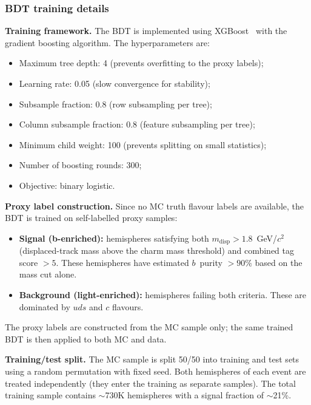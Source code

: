 \documentclass[11pt,a4paper]{article}
\begin{document}
\subsubsection{BDT training details}
\label{sec:bdt-detail}

\textbf{Training framework.}
The BDT is implemented using XGBoost~\cite{xgboost} with the gradient
boosting algorithm.  The hyperparameters are:
\begin{itemize}
\item Maximum tree depth: 4 (prevents overfitting to the proxy labels);
\item Learning rate: 0.05 (slow convergence for stability);
\item Subsample fraction: 0.8 (row subsampling per tree);
\item Column subsample fraction: 0.8 (feature subsampling per tree);
\item Minimum child weight: 100 (prevents splitting on small statistics);
\item Number of boosting rounds: 300;
\item Objective: binary logistic.
\end{itemize}

\textbf{Proxy label construction.}
Since no MC truth flavour labels are available, the BDT is trained on
self-labelled proxy samples:
\begin{itemize}
\item \textbf{Signal (b-enriched):} hemispheres satisfying both
  $m_\mathrm{disp} > 1.8$~GeV/$c^2$ (displaced-track mass above the
  charm mass threshold) and combined tag score $> 5$.  These hemispheres
  have estimated $b$~purity $> 90\%$ based on the mass cut alone.
\item \textbf{Background (light-enriched):} hemispheres failing both
  criteria.  These are dominated by $uds$ and $c$ flavours.
\end{itemize}
The proxy labels are constructed from the MC sample only; the same trained
BDT is then applied to both MC and data.

\textbf{Training/test split.}
The MC sample is split 50/50 into training and test sets using a random
permutation with fixed seed.  Both hemispheres of each event are treated
independently (they enter the training as separate samples).  The total
training sample contains $\sim$730K hemispheres with a signal fraction
of $\sim$21\%.
\end{document}
